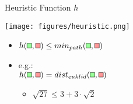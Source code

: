 \documentclass{presentation}
\begin{document}
\begin{frame}{Heuristic Function $h$}
	\begin{minipage}{0.3\textwidth}
		\texttt{[image: figures/heuristic.png]}
	\end{minipage}%
	\hfill%
	\begin{minipage}{0.6\textwidth}
		\begin{itemize}
		\item $h(\tikz{\path[draw=black,fill=white!60!green] (0,0) rectangle (2mm,2mm);},\tikz{\path[draw=black,fill=white!60!red] (0,0) rectangle (2mm,2mm);})\leq min_{path}(\tikz{\path[draw=black,fill=white!60!green] (0,0) rectangle (2mm,2mm);},\tikz{\path[draw=black,fill=white!60!red] (0,0) rectangle (2mm,2mm);})$
		\pause
		\item e.g.:\\ $h(\tikz{\path[draw=black,fill=white!60!green] (0,0) rectangle (2mm,2mm);},\tikz{\path[draw=black,fill=white!60!red] (0,0) rectangle (2mm,2mm);}) = dist_{euklid}(\tikz{\path[draw=black,fill=white!60!green] (0,0) rectangle (2mm,2mm);},\tikz{\path[draw=black,fill=white!60!red] (0,0) rectangle (2mm,2mm);})$
		\begin{itemize}
			\item $\sqrt{27} \leq 3+3\cdot\sqrt{2}$
		\end{itemize}
		\end{itemize}
	\end{minipage}
\end{frame}

\begin{frame}
\end{frame}



\begin{frame}
\end{frame}



\begin{frame}
\end{frame}



\begin{frame}
\end{frame}



\begin{frame}
\end{frame}



\begin{frame}
\end{frame}
\end{document}
